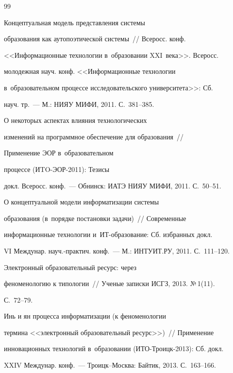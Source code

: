 {{\begin{thebibliography}{99}

 Концептуальная модель представления системы

образования как аутопоэтической системы~/\!\!/ Всеросс. конф.

<<Информационные технологии в~образовании XXI~века>>. Всеросс.

молодежная науч. конф. <<Информационные технологии

в~образовательном процессе исследовательского университета>>: Сб.

науч. тр.~--- М.: НИЯУ МИФИ, 2011. С.~381--385.


 О некоторых аспектах влияния технологических

изменений на программное обеспечение для образования~/\!\!/

Применение ЭОР в~образовательном

 процессе (ИTO-ЭОР-2011): Тезисы

докл. Всеросс. конф.~--- Обнинск: ИАТЭ НИЯУ МИФИ, 2011. С.~50--51.







 О концептуальной модели информатизации системы

образования (в~порядке постановки задачи)~/\!\!/ Современные

информационные технологии и~ИТ-обра\-зо\-ва\-ние: Сб. избранных докл.

VI Междунар. на\-уч.-прак\-тич. конф.~--- М.: ИНТУИТ.РУ, 2011. С.~111--120.


 Электронный образовательный ресурс: через

феноменологию к типологии~/\!\!/ Ученые записки ИСГЗ, 2013. №\,1(11).

С.~72--79.


 Инь и ян процесса информатизации (к феноменологии

термина <<электронный образовательный ресурс>>)~/\!\!/ Применение

инновационных технологий в~образовании (ИТО-Троицк-2013): Сб. докл.

XXIV Междунар. конф.~---  Троицк--Москва: Байтик, 2013. С.~163--166.


\end{thebibliography}}}
